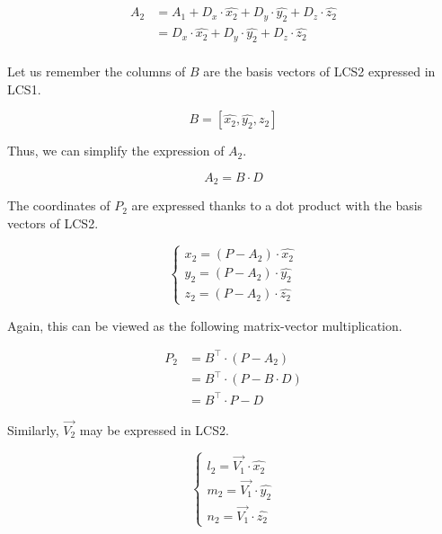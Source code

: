 \begin{equation} \begin{split}
A_2 &= A_1 + D_x \cdot \hat{x_2} + D_y \cdot \hat{y_2} + D_z \cdot \hat{z_2} \\
    &= D_x \cdot \hat{x_2} + D_y \cdot \hat{y_2} + D_z \cdot \hat{z_2} \\
\end{split} \end{equation}

Let us remember the columns of $B$ are the basis vectors of LCS2 expressed
in LCS1.

\begin{equation}
B = \left[ \hat{x_2}, \hat{y_2}, \hat{z_2} \right]
\end{equation}

Thus, we can simplify the expression of $A_2$.

\begin{equation}
A_2 = B \cdot D
\end{equation}

The coordinates of $P_2$ are expressed thanks to a dot product with the basis
vectors of LCS2.

\begin{equation} \begin{cases}
x_2 = (P - A_2) \cdot \hat{x_2} \\
y_2 = (P - A_2) \cdot \hat{y_2} \\
z_2 = (P - A_2) \cdot \hat{z_2}
\end{cases} \end{equation}

Again, this can be viewed as the following matrix-vector multiplication.

\begin{equation} \begin{split}
P_2 &= B^\top \cdot (P - A_2) \\
    &= B^\top \cdot (P - B \cdot D) \\
    &= B^\top \cdot P - D
\end{split} \end{equation}

Similarly, $\overrightarrow{V_2}$ may be expressed in LCS2.

\begin{equation} \begin{cases}
l_2 = \overrightarrow{V_1} \cdot \hat{x_2} \\
m_2 = \overrightarrow{V_1} \cdot \hat{y_2} \\
n_2 = \overrightarrow{V_1} \cdot \hat{z_2}
\end{cases} \end{equation}

